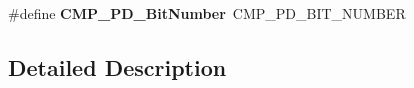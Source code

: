 \begin{DoxyCompactItemize}
\item 
\#define {\bfseries C\+M\+P\+\_\+\+P\+D\+\_\+\+Bit\+Number}~C\+M\+P\+\_\+\+P\+D\+\_\+\+B\+I\+T\+\_\+\+N\+U\+M\+B\+ER\hypertarget{group___h_a_l___aliased___macros_ga0ca336e48ea4840c7d1cde05a0e07e82}{}\label{group___h_a_l___aliased___macros_ga0ca336e48ea4840c7d1cde05a0e07e82}

\end{DoxyCompactItemize}


\subsection{Detailed Description}
